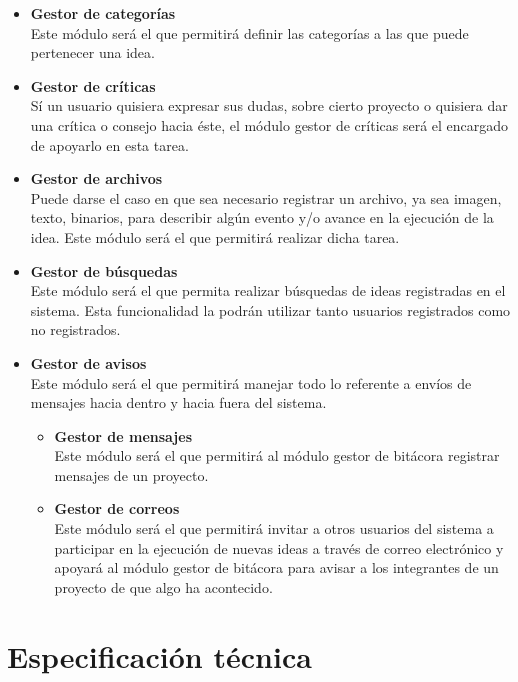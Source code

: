 \documentclass[12pt,letterpaper,titlepage]{article}
\begin{document}
\begin{itemize}
 \item \textbf{Gestor de categor\'ias}\\
Este m\'odulo ser\'a el que permitir\'a definir las categor\'ias a las que puede pertenecer una idea.


 \item \textbf{Gestor de cr\'iticas}\\
S\'i un usuario quisiera expresar sus dudas, sobre cierto proyecto o quisiera dar una cr\'itica o consejo hacia \'este, el m\'odulo gestor de cr\'iticas ser\'a el encargado de apoyarlo en esta tarea.

 \item \textbf{Gestor de archivos}\\
Puede darse el caso en que sea necesario registrar un archivo, ya sea imagen, texto, binarios, para describir alg\'un evento y/o avance en la ejecuci\'on de la idea. Este m\'odulo ser\'a el que permitir\'a realizar dicha tarea.

 \item \textbf{Gestor de b\'usquedas}\\
Este m\'odulo ser\'a el que permita realizar b\'usquedas de ideas registradas en el sistema. Esta funcionalidad la podr\'an utilizar tanto usuarios registrados como no registrados.

 \item \textbf{Gestor de avisos}\\
Este m\'odulo ser\'a el que permitir\'a manejar todo lo referente a env\'ios de mensajes hacia dentro y hacia fuera del sistema. 
 
\begin{itemize}
 \item  \textbf{Gestor de mensajes}\\
Este m\'odulo ser\'a el que permitir\'a al m\'odulo gestor de bit\'acora registrar mensajes de un proyecto.

 \item \textbf{Gestor de correos}\\
Este m\'odulo ser\'a el que permitir\'a invitar a otros usuarios del sistema a participar en la ejecuci\'on de nuevas ideas a trav\'es de correo electr\'onico y apoyar\'a al m\'odulo gestor de bit\'acora para avisar a los integrantes de un proyecto de que algo ha acontecido.
\end{itemize}
\end{itemize}


\section{Especificaci\'on t\'ecnica}
\end{document}
